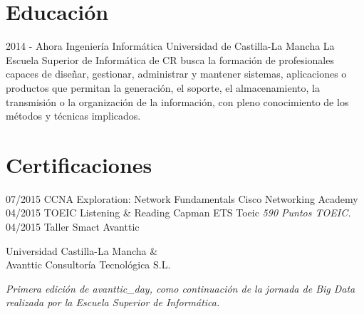 \documentclass[]{friggeri-cv}
\begin{document}
\section{Educación}
\begin{entrylist}
  \entry
    {2014 - Ahora}
    {Ingeniería Informática}
    {Universidad de Castilla-La Mancha}
    {La Escuela Superior de Informática de CR busca la formación de profesionales capaces de diseñar, gestionar, administrar y mantener sistemas, aplicaciones o productos que permitan la generación, el soporte, el almacenamiento, la transmisión o la organización de la información, con pleno conocimiento de los métodos y técnicas implicados.}\\
\end{entrylist}

\section{Certificaciones}
\begin{entrylist}
  \entry
    {07/2015}
    {CCNA Exploration: Network Fundamentals}
    {Cisco Networking Academy}
    {\emph{\\}}
    \entry
    {04/2015}
    {TOEIC Listening \& Reading}
    {Capman ETS Toeic}
    {\emph{590 Puntos TOEIC.\\}}
    \entry
    {04/2015}
    {Taller Smact Avanttic}
    {\begin{flushright}Universidad Castilla-La Mancha \& \\Avanttic Consultoría Tecnológica S.L.\end{flushright}}
    {\emph{Primera edición de avanttic\_day, como continuación de la jornada de Big Data realizada por la Escuela Superior de Informática.}}
\end{entrylist}
\end{document}
